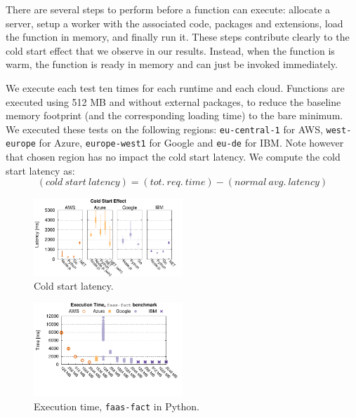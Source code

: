 There are several steps to perform before a function can execute: allocate a server, setup a worker with the associated code, packages and extensions, load the function in memory, and finally run it.
These steps contribute clearly to the cold start effect that we observe in our results.
Instead, when the function is warm, the function is ready in memory and can just be invoked immediately. 

We execute each test ten times for each runtime and each cloud. 
Functions are executed using 512 \gls{MB} and without external packages, to reduce the baseline memory footprint (and the corresponding loading time) to the bare minimum.
We executed these tests on the following regions: \texttt{eu-central-1} for AWS,  \texttt{west-europe} for Azure,  \texttt{europe-west1} for Google and \texttt{eu-de} for IBM. 
Note however that chosen region has no impact the cold start latency. 
We compute the cold start latency as:
\begin{equation*}
(cold\ start\ latency) = (tot.\ req.\ time) - (normal\ avg.\ latency)
\end{equation*}

\begin{figure}[!t]
\centering
\includegraphics[width=0.5\textwidth]{bilder/cold_start/coldstart_whisker.pdf}
\caption{Cold start latency.}
\label{fig:coldstart_plot}
\end{figure}



\begin{figure}[!t]
\centering
\includegraphics[width=0.5\textwidth, trim={0 40 0 0}]{bilder/general_python/cpufact.pdf}
\caption{Execution time, \texttt{faas-fact} in Python.}
\label{fig:general_python_plot}
\end{figure}

